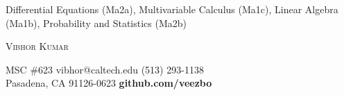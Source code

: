 


	\smallskip
	\item Differential Equations (Ma2a), Multivariable Calculus (Ma1c), Linear Algebra (Ma1b), Probability and Statistics (Ma2b)
	
	\begin{center} 
	{\Large \scshape Vibhor Kumar} 
\end{center}
	\vspace*{-2pt}
\hspace{17mm} MSC \#623 \hspace{24mm} vibhor@caltech.edu \hspace{24mm} (513) 293-1138\\
\hspace{3mm} Pasadena, CA 91126-0623 \hspace{14mm} \textbf{github.com/veezbo}

\vspace{-10pt}